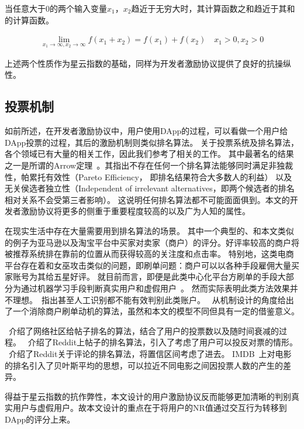 \begin{property}
\label{prop:two}
当任意大于$0$的两个输入变量$x_1$，$x_2$趋近于无穷大时，其计算函数之和趋近于其和的计算函数。
\end{property}
\begin{align}
\lim\limits_{x_1 \to \infty, x_2\to \infty} f(x_1+x_2) = f(x_1) + f(x_2)\quad x_1>0, x_2>0
\end{align}

\noindent 上述两个性质作为星云指数的基础，同样为开发者激励协议提供了良好的抗操纵性。

\subsection{投票机制}
如前所述，在开发者激励协议中，用户使用DApp的过程，可以看做一个用户给DApp投票的过程，其后的激励机制则类似排名算法。
关于投票系统及排名算法，各个领域已有大量的相关工作，因此我们参考了相关的工作。
其中最著名的结果之一是所谓的Arrow定理~\cite{arrow1951extension}。其指出不存在任何一个排名算法能够同时满足非独裁性，帕累托有效性（Pareto Efficiency， 即排名结果符合大多数人的利益）
以及无关侯选者独立性（Independent of irrelevant alternatives，即两个候选者的排名相对关系不会受第三者影响）。
这说明任何排名算法都不可能面面俱到。本文的开发者激励协议将更多的侧重于重要程度较高的以及广为人知的属性。

在现实生活中存在大量需要用到排名算法的场景。
其中一个典型的、和本文类似的例子为亚马逊以及淘宝平台中买家对卖家（商户）的评分。好评率较高的商户将被推荐系统排在靠前的位置从而获得较高的关注度和点击率。
特别地，这类电商平台存在着和女巫攻击类似的问题，即刷单问题：商户可以以各种手段雇佣大量买家账号为其给五星好评。
就目前而言，即便是此类中心化平台方刷单的手段大部分为通过机器学习手段判断真实用户和虚假用户~\cite{mukherjee2013spotting,jindal2008opinion,yoo2009comparison}。
然而实际表明此类方法效果并不理想。~\cite{ott2011finding}指出甚至人工识别都不能有效判别此类账户。
~\cite{cai2016mechanism}从机制设计的角度给出了一个消除商户刷单动机的算法，虽然和本文的模型不同但具有一定的借鉴意义。


~\cite{salihefendic2010hacker}介绍了网络社区给帖子排名的算法，结合了用户的投票数以及随时间衰减的过程。
~\cite{salihefendic2010reddit}介绍了Reddit上帖子的排名算法，引入了考虑了用户可以投反对票的情形。
~\cite{miller2009how}介绍了Reddit关于评论的排名算法，将置信区间考虑了进去。
IMDB~\cite{IMDB}上对电影的排名引入了贝叶斯平均的思想，可以拉近不同电影之间因投票人数的产生的差异。

得益于星云指数的抗作弊性，本文设计的用户激励协议反而能够更加清晰的判别真实用户与虚假用户。故本文设计的重点在于将用户的NR值通过交互行为转移到DApp的评分上来。



